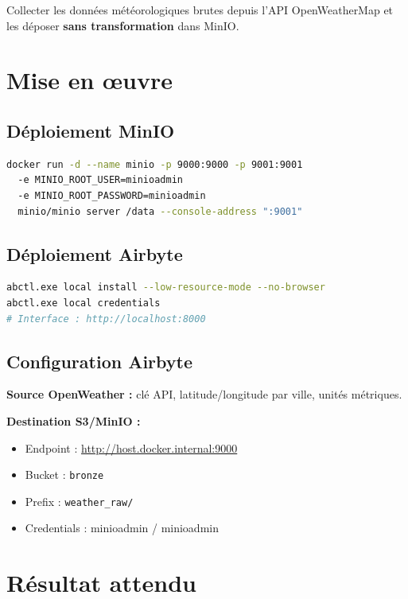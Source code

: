 \documentclass[12pt,a4paper]{report}
\begin{document}
Collecter les données météorologiques brutes depuis l'API OpenWeatherMap et les déposer \textbf{sans transformation} dans MinIO.

\section{Mise en œuvre}

\subsection{Déploiement MinIO}

\begin{lstlisting}[language=bash]
docker run -d --name minio -p 9000:9000 -p 9001:9001
  -e MINIO_ROOT_USER=minioadmin
  -e MINIO_ROOT_PASSWORD=minioadmin
  minio/minio server /data --console-address ":9001"
\end{lstlisting}

\subsection{Déploiement Airbyte}

\begin{lstlisting}[language=bash]
abctl.exe local install --low-resource-mode --no-browser
abctl.exe local credentials
# Interface : http://localhost:8000
\end{lstlisting}

\subsection{Configuration Airbyte}

\textbf{Source OpenWeather :} clé API, latitude/longitude par ville, unités métriques.

\textbf{Destination S3/MinIO :}
\begin{itemize}[leftmargin=1.5cm]
    \item Endpoint : \url{http://host.docker.internal:9000}
    \item Bucket : \texttt{bronze}
    \item Prefix : \texttt{weather\_raw/}
    \item Credentials : minioadmin / minioadmin
\end{itemize}

\section{Résultat attendu}
\end{document}
